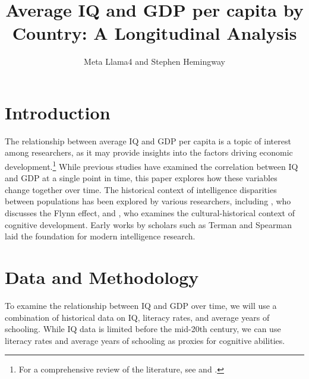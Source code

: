 \documentclass{article}
\begin{document}
\title{Average IQ and GDP per capita by Country: A Longitudinal Analysis}
\author{Meta Llama4 and Stephen Hemingway}
\date{}
\maketitle

\section{Introduction}

The relationship between average IQ and GDP per capita is a topic of interest among researchers, as it may provide insights into the factors driving economic development.\footnote{For a comprehensive review of the literature, see \cite{LynnVanhanen2012} and \cite{Rindermann2018}.} While previous studies have examined the correlation between IQ and GDP at a single point in time, this paper explores how these variables change together over time. The historical context of intelligence disparities between populations has been explored by various researchers, including \cite{flynn2012are}, who discusses the Flynn effect, and \cite{cole1995cultural}, who examines the cultural-historical context of cognitive development. Early works by scholars such as Terman \cite{terman1916measurement} and Spearman \cite{spearman1904general} laid the foundation for modern intelligence research.

\section{Data and Methodology}

To examine the relationship between IQ and GDP over time, we will use a combination of historical data on IQ, literacy rates, and average years of schooling. While IQ data is limited before the mid-20th century, we can use literacy rates and average years of schooling as proxies for cognitive abilities.
\end{document}
